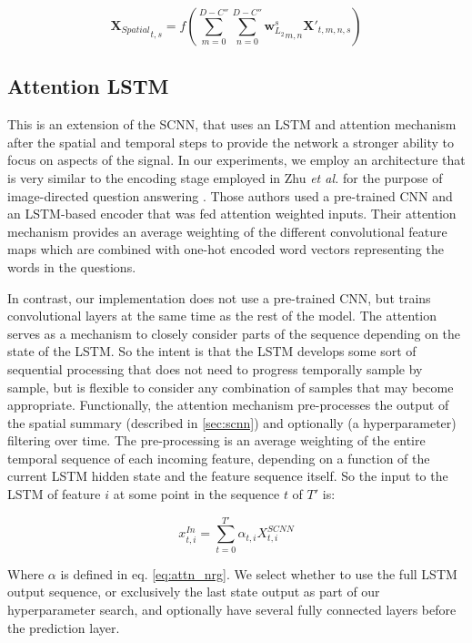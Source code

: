 \documentclass[fleqn,10pt]{wlscirep}
\begin{document}
\begin{equation} \label{eq:scnn_s2}
  {\boldsymbol{X}_{Spatial}}_{t, s} = f(\sum_{m=0}^{D-C''}\sum_{n=0}^{D-C''}{\boldsymbol{w}_{L_2}^s}_{m,n} \boldsymbol{X'}_{t, m, n, s})
\end{equation}

\subsection*{Attention LSTM}

This is an extension of the SCNN, that uses an LSTM and attention mechanism after the spatial and temporal steps to provide the network a stronger ability to focus on aspects of the signal. In our experiments, we employ an architecture that is very similar to the encoding stage employed in Zhu {\em et al.} for the purpose of image-directed question answering \cite{Zhu}. Those authors used a pre-trained CNN and an LSTM-based encoder that was fed attention weighted inputs. Their attention mechanism provides an average weighting of the different convolutional feature maps which are combined with one-hot encoded word vectors representing the words in the questions.

In contrast, our implementation does not use a pre-trained CNN, but trains convolutional layers at the same time as the rest of the model. The attention serves as a mechanism to closely consider parts of the sequence depending on the state of the LSTM. So the intent is that the LSTM develops some sort of sequential processing that does not need to progress temporally sample by sample, but is flexible to consider any combination of samples that may become appropriate. Functionally, the attention mechanism pre-processes the output of the spatial summary (described in \ref{sec:scnn}) and optionally (a hyperparameter) filtering over time. The pre-processing is an average weighting of the entire temporal sequence of each incoming feature, depending on a function of the current LSTM hidden state and the feature sequence itself. So the input to the LSTM of feature $i$ at some point in the sequence $t$ of $T'$ is:

\begin{equation}
  x_{t,i}^{In} = \sum_{t=0}^{T'} \alpha_{t,i} X_{t,i}^{SCNN}
\end{equation}

Where $\alpha$ is defined in eq. \ref{eq:attn_nrg}. We select whether to use the full LSTM output sequence, or exclusively the last state output as part of our hyperparameter search, and optionally have several fully connected layers before the prediction layer.
\end{document}
